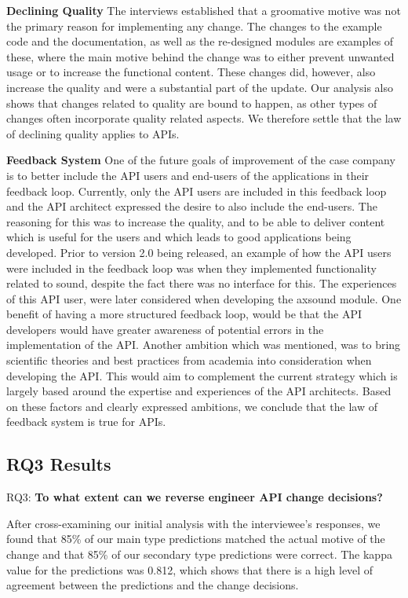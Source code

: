 \documentclass{sig-alternate}
\begin{document}
\smallskip \noindent
\textbf{Declining Quality  } 
The interviews established that a groomative motive was not the primary reason for implementing any change. The changes to the example code and the documentation, as well as the re-designed modules are examples of these, where the main motive behind the change was to either prevent unwanted usage or to increase the functional content. These changes did, however, also increase the quality and were a substantial part of the update. Our analysis also shows that changes related to quality are bound to happen, as other types of changes often incorporate quality related aspects. We therefore settle that the law of declining quality applies to APIs. 

\smallskip \noindent
\textbf{Feedback System  } 
One of the future goals of improvement of the case company is to better include the API users and end-users of the applications in their feedback loop. Currently, only the API users are included in this feedback loop and the API architect expressed the desire to also include the end-users. The reasoning for this was to increase the quality, and to be able to deliver content which is useful for the users and which leads to good applications being developed. Prior to version 2.0 being released, an example of how the API users were included in the feedback loop was when they implemented functionality related to sound, despite the fact there was no interface for this.  The experiences of this API user, were later considered when developing the axsound module. One benefit of having a more structured feedback loop, would be that the API developers would have greater awareness of potential errors in the implementation of the API. Another ambition which was mentioned, was to bring scientific theories and best practices from academia into consideration when developing the API. This would aim to complement the current strategy which is largely based around the expertise and experiences of the API architects. Based on these factors and clearly expressed ambitions, we conclude that the law of feedback system is true for APIs. 



\subsection{RQ3 Results}
\noindent
RQ3: \textbf{To what extent can we reverse engineer API change decisions?}
\smallskip

After cross-examining our initial analysis with the interviewee's responses, we found that 85\% of our main type predictions matched the actual motive of the change and that 85\% of our secondary type predictions were correct. The kappa value \cite{cohen1968weighted} for the predictions was 0.812, which shows that there is a high level of agreement between the predictions and the change decisions. 
\end{document}
